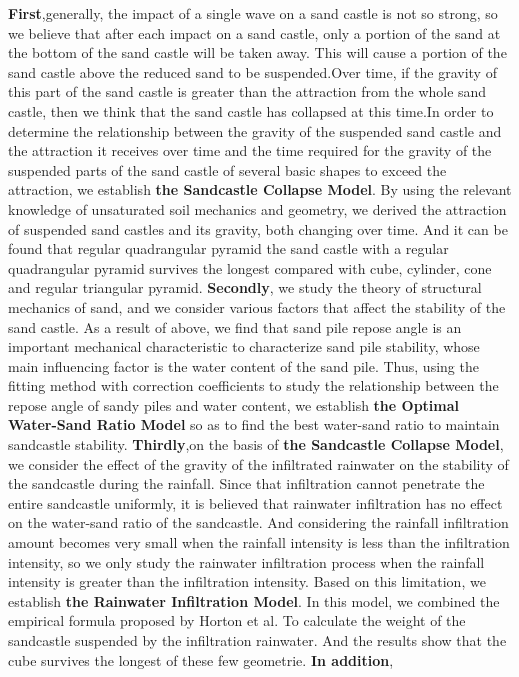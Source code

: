 \documentclass[12pt]{article}
\begin{document}
\textbf{First},generally, the impact of a single wave on a sand castle is not so strong, so we believe that after each impact on a sand castle, only a portion of the sand at the bottom of the sand castle will be taken away. This will cause a portion of the sand castle above the reduced sand to be suspended.Over time, if the gravity of this part of the sand castle is greater than the attraction from the whole sand castle, then we think that the sand castle has collapsed at this time.In order to determine the relationship between the gravity of the suspended sand castle and the attraction it receives over time and the time required for the gravity of the suspended parts of the sand castle of several basic shapes to exceed the attraction, we establish \textbf{the Sandcastle Collapse Model}. By using the relevant knowledge of unsaturated soil mechanics and geometry, we derived the attraction of suspended sand castles and its gravity, both changing over time. And it can be found that regular quadrangular pyramid the sand castle with a regular quadrangular pyramid survives the longest compared with cube, cylinder, cone and regular triangular pyramid. \textbf{Secondly}, we study the theory of structural mechanics of sand, and we consider various factors that affect the stability of the sand castle. As a result of above, we find that sand pile repose angle is an important mechanical characteristic to characterize sand pile stability, whose main influencing factor is the water content of the sand pile. Thus, using the fitting method with correction coefficients to study the relationship between the repose angle of sandy piles and water content,  we establish \textbf{the Optimal Water-Sand Ratio Model} so as to find the best water-sand ratio to maintain sandcastle stability. \textbf{Thirdly},on the basis of \textbf{the Sandcastle Collapse Model}, we consider the effect of the gravity of the infiltrated rainwater on the stability of the sandcastle during the rainfall. Since that infiltration cannot penetrate the entire sandcastle uniformly, it is believed that rainwater infiltration has no effect on the water-sand ratio of the sandcastle. And considering the rainfall infiltration amount becomes very small when the rainfall intensity is less than the infiltration intensity, so we only study the rainwater infiltration process when the rainfall intensity is greater than the infiltration intensity. Based on this limitation, we establish \textbf{the Rainwater Infiltration Model}. In this model, we combined the empirical formula proposed by Horton et al. To calculate the weight of the sandcastle suspended by the infiltration rainwater.
And the results show that the cube survives the longest of these few geometrie. \textbf{In addition},
\end{document}
